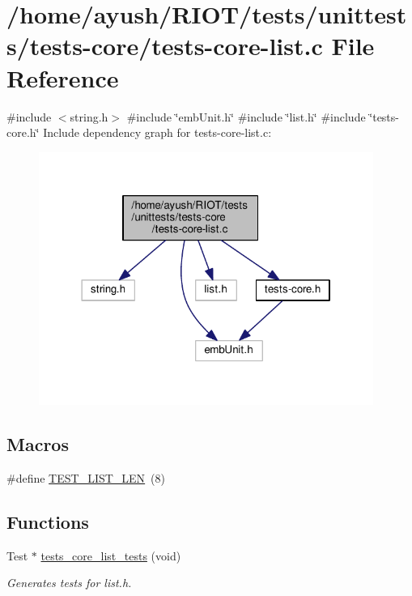 \hypertarget{tests-core-list_8c}{}\section{/home/ayush/\+R\+I\+O\+T/tests/unittests/tests-\/core/tests-\/core-\/list.c File Reference}
\label{tests-core-list_8c}
{\ttfamily \#include $<$string.\+h$>$}\newline
{\ttfamily \#include \char`\"{}emb\+Unit.\+h\char`\"{}}\newline
{\ttfamily \#include \char`\"{}list.\+h\char`\"{}}\newline
{\ttfamily \#include \char`\"{}tests-\/core.\+h\char`\"{}}\newline
Include dependency graph for tests-\/core-\/list.c\+:
\nopagebreak
\begin{figure}[H]
\begin{center}
\leavevmode
\includegraphics[width=310pt]{tests-core-list_8c__incl}
\end{center}
\end{figure}
\subsection*{Macros}
\begin{DoxyCompactItemize}
\item 
\#define \hyperlink{tests-core-list_8c_ad1fc22ce9e16b3b81aa644afff9a6283}{T\+E\+S\+T\+\_\+\+L\+I\+S\+T\+\_\+\+L\+EN}~(8)
\end{DoxyCompactItemize}
\subsection*{Functions}
\begin{DoxyCompactItemize}
\item 
Test $\ast$ \hyperlink{group__unittests_gac59771a00b4ae805ba06afd6e93578cb}{tests\+\_\+core\+\_\+list\+\_\+tests} (void)
\begin{DoxyCompactList}\small\item\em Generates tests for list.\+h. \end{DoxyCompactList}\end{DoxyCompactItemize}


